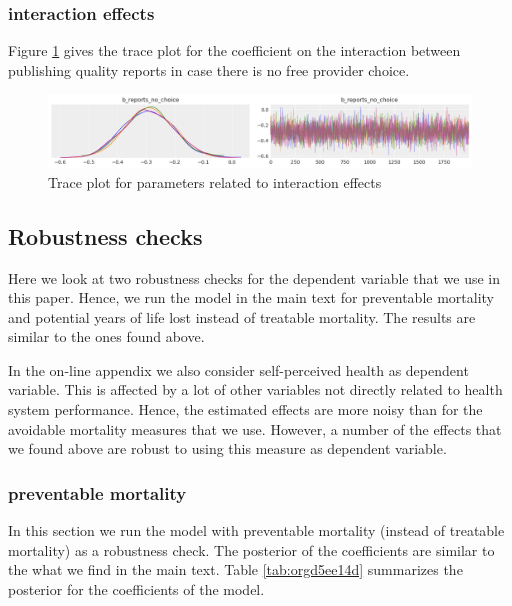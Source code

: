 \documentclass[12pt,english,a4paper]{article}
\begin{document}
\subsubsection{interaction effects}
\label{sec:org7677583}

Figure \ref{fig:orgfbc419c} gives the trace plot for the coefficient on the interaction between publishing quality reports in case there is no free provider choice.

\begin{figure}[htbp]
\centering
\includegraphics[width=.9\linewidth]{./figures/trace_interaction.png}
\caption{\label{fig:orgfbc419c}Trace plot for parameters related to interaction effects}
\end{figure}



\subsection{Robustness checks}
\label{sec:org455ca75}
\label{app:robustness}

Here we look at two robustness checks for the dependent variable that we use in this paper. Hence, we run the model in the main text for preventable mortality and potential years of life lost instead of treatable mortality. The results are similar to the ones found above.

In the on-line appendix we also consider self-perceived health as dependent variable. This is affected by a lot of other variables not directly related to health system performance. Hence, the estimated effects are more noisy than for the avoidable mortality measures that we use. However, a number  of the effects that we found above are robust to using this measure as dependent variable.

\subsubsection{preventable mortality}
\label{sec:org44286aa}

In this section we run the model with preventable mortality (instead of treatable mortality) as a robustness check. The posterior of the coefficients are similar to the what we find in the main text. Table \ref{tab:orgd5ee14d} summarizes the posterior for the coefficients of the model.
\end{document}
